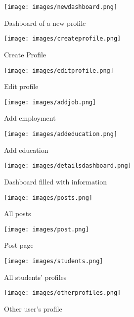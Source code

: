 \documentclass[12pt]{article}
\begin{document}
\begin{figure} 
    \centering
    \texttt{[image: images/newdashboard.png]}
    \caption{Dashboard of a new profile}
\end{figure}


\begin{figure}
    \centering
    \texttt{[image: images/createprofile.png]}
    \caption{Create Profile}
\end{figure}

\begin{figure}[H] 
    \centering
    \texttt{[image: images/editprofile.png]}
    \caption{Edit profile}
\end{figure}

\begin{figure} 
    \centering
    \texttt{[image: images/addjob.png]}
    \caption{Add employment}
\end{figure}

\begin{figure}[H]
    \centering
    \texttt{[image: images/addeducation.png]}
    \caption{Add education}
\end{figure}

\begin{figure} 
    \centering
    \texttt{[image: images/detailsdashboard.png]}
    \caption{Dashboard filled with information}
\end{figure}

\begin{figure} 
    \centering
    \texttt{[image: images/posts.png]}
    \caption{All posts}
\end{figure}

\begin{figure} 
    \centering
    \texttt{[image: images/post.png]}
    \caption{Post page}
\end{figure}

\begin{figure} 
    \centering
    \texttt{[image: images/students.png]}
    \caption{All students' profiles}
\end{figure}

\begin{figure} 
    \centering
    \texttt{[image: images/otherprofiles.png]}
    \caption{Other user's profile}
\end{figure}
\end{document}
